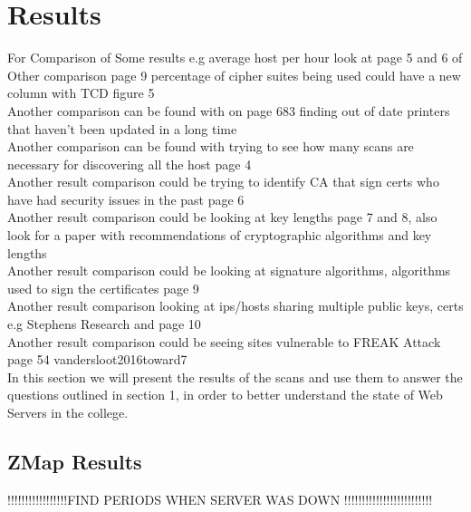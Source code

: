 \documentclass[a4wide,leqno,12pt]{report}
\begin{document}
\chapter{Results}

For Comparison of Some results e.g average host per hour look at page 5 and 6 of \cite{durumeric2013zmap}\\

Other comparison \cite{durumeric2015search} page 9 percentage of cipher suites being used could have a new column with TCD figure 5\\

Another comparison can be found with \cite{lee2016implementation} on page 683 finding out of date printers that haven't been updated in a long time\\

Another comparison can be found with trying to see how many scans are necessary for discovering all the host \cite{durumeric2013analysis} page 4\\

Another result comparison could be trying to identify CA that sign certs who have had security issues in the past \cite{durumeric2013analysis} page 6\\

Another result comparison could be looking at key lengths \cite{durumeric2013analysis} page 7 and 8, also look for a paper with recommendations of cryptographic algorithms and key lengths\\

Another result comparison could be looking at signature algorithms, algorithms used to sign the certificates \cite{durumeric2013analysis} page 9\\

Another result comparison looking at ips/hosts sharing multiple public keys, certs e.g Stephens Research and \cite{durumeric2013analysis} page 10\\

Another result comparison could be seeing sites vulnerable to FREAK Attack \cite{vandersloot2016toward} page 54
vandersloot2016toward7\\


In this section we will
present the results of the scans and use them to answer the questions outlined in section 1, in order to better understand the state of Web Servers in the college.


\section{ZMap Results}
!!!!!!!!!!!!!!!!!FIND PERIODS WHEN SERVER WAS DOWN !!!!!!!!!!!!!!!!!!!!!!!!!
\end{document}
